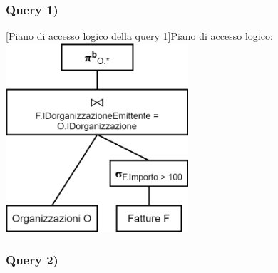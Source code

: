\documentclass[a4paper,12pt]{article}
\begin{document}
 \subsubsection{ Query 1) }

\begin{minipage}{\textwidth}
\begin{multicols}{2}

\null \vfill

\vfill \null

\columnbreak

 [Piano di accesso logico della query 1]{Piano di accesso logico:}
\includegraphics[height=7cm]{ Albero logico 1.png }

\end{multicols}
\end{minipage}

 \subsubsection{ Query 2) }
\end{document}
